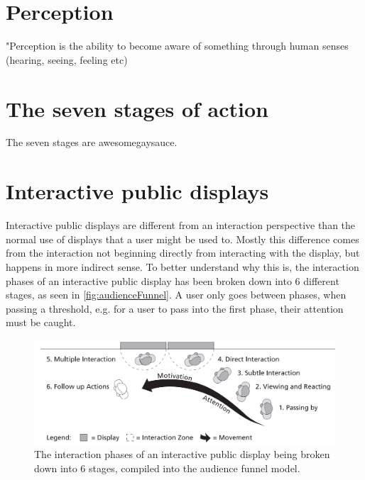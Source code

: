 



\section{Perception}
"Perception is the ability to become aware of something through human senses (hearing, seeing, feeling etc)\\







\section{The seven stages of action} %
    The seven stages are awesomegaysauce. 



\section{Interactive public displays} %
    Interactive public displays are different from an interaction perspective than the normal use of displays that a user might be used to\cite{interactivePublicDisplays}. Mostly this difference comes from the interaction not beginning directly from interacting with the display, but happens in more indirect sense. To better understand why this is, the interaction phases of an interactive public display has been broken down into 6 different stages, as seen in \autoref{fig:audienceFunnel}. A user only goes between phases, when passing a threshold, e.g. for a user to pass into the first phase, their attention must be caught\cite{interactivePublicDisplays}.
    
    \begin{figure}[H]
    	\centering
    	\includegraphics[width=0.9\linewidth]{figure/Analysis/AudienceFunnel.png}
    	\caption{The interaction phases of an interactive public display being broken down into 6 stages, compiled into the audience funnel model\cite{interactivePublicDisplays}.}
    	\label{fig:audienceFunnel}
    \end{figure}
    

